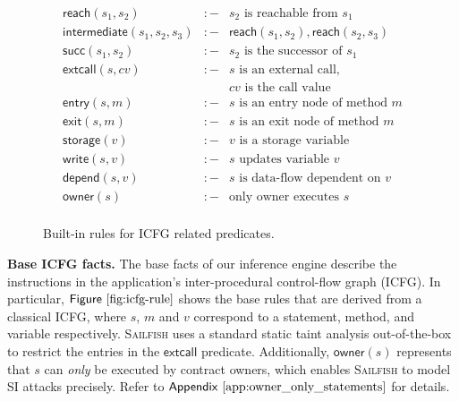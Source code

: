 \documentclass[conference, romanappendices]{tex/IEEEtran}
\theoremstyle{bfnote}
\newcommand{\toolname}{\textsc{Sailfish}\xspace}
\newcommand{\Fig}[1]{\ensuremath{\sf Figure~\ref{#1}}}
\newcommand{\Appen}[1]{\ensuremath{\sf Appendix~\ref{#1}}}
\begin{document}
\begin{figure}[ht]
	\vspace{-6mm}
	\small
    \[\begin{array}{rlll}
      \mathsf{reach}(s_1, s_2) & :- & \text{$s_2$ is reachable from $s_1$}\\
      \mathsf{intermediate}(s_1, s_2, s_3) & :- & \mathsf{reach}(s_1, s_2), \mathsf{reach}(s_2, s_3)\\
      \mathsf{succ}(s_1, s_2) & :- & \text{$s_2$ is the successor of $s_1$}\\
      \mathsf{extcall}(s, cv) & :- & \text{$s$ is an external call}, \\
                                   & & \text{$cv$ is the call value} \\ 
      \mathsf{entry}(s,m) & :- & \text{$s$ is an entry node of method $m$}\\
      \mathsf{exit}(s,m) & :- & \text{$s$ is an exit node of method $m$}\\
      \mathsf{storage}(v) & :- & \text{$v$ is a storage variable}\\
      \mathsf{write}(s, v) & :- & \text{$s$ updates variable $v$}\\
      \mathsf{depend}(s, v) & :- & \text{$s$ is data-flow dependent on $v$}\\
      \mathsf{owner}(s) & :- & \text{only owner executes $s$} \\
    \end{array}\]
    \vspace{-3.1mm}
    \caption{\small Built-in rules for ICFG related predicates.}
    \label{fig:icfg-rule}
    \vspace{-2.5mm}
\end{figure}

\noindent
\textbf{Base ICFG facts.}
The base facts of our inference engine describe the instructions in the application's inter-procedural control-flow graph ({ICFG\EndAccSupp{}}).
In particular, \Fig{fig:icfg-rule} shows the base rules that are derived from a classical {ICFG\EndAccSupp{}}, where $s$, $m$ and $v$ correspond to a statement,  method, and variable respectively.
\toolname uses a standard static taint analysis out-of-the-box to restrict the entries in the $\mathsf{extcall}$ predicate.
Additionally, $\mathsf{owner}(s)$ represents that $s$ can \textit{only} be executed by contract owners, which enables \toolname to model SI attacks precisely.
Refer to \Appen{app:owner_only_statements} for details.
\end{document}
